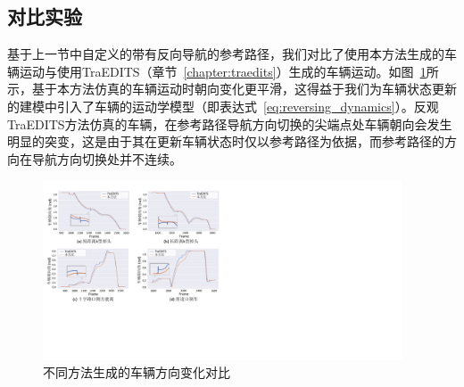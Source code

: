 \subsection{对比实验}
\label{section:reversing_comparison}


基于上一节中自定义的带有反向导航的参考路径，我们对比了使用本方法生成的车辆运动与使用TraEDITS（章节~\ref{chapter:traedits}）生成的车辆运动。如图~\ref{fig:reversing_orientcmp}所示，基于本方法仿真的车辆运动时朝向变化更平滑，这得益于我们为车辆状态更新的建模中引入了车辆的运动学模型（即表达式~\ref{eq:reversing_dynamics}）。反观TraEDITS方法仿真的车辆，在参考路径导航方向切换的尖端点处车辆朝向会发生明显的突变，这是由于其在更新车辆状态时仅以参考路径为依据，而参考路径的方向在导航方向切换处并不连续。


\begin{figure}[!tbh]
\centering
\includegraphics[width=0.95\textwidth]{figure/reversing/orientation v3.pdf}
\caption[不同方法生成的车辆方向变化对比]{
不同方法生成的车辆方向变化对比
}
\label{fig:reversing_orientcmp}
\end{figure}

